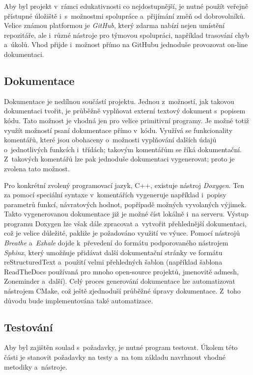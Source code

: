 Aby byl projekt v~rámci edukativnosti co nejdostupnější, je nutné použít veřejně přístupné úložiště i~s~možnostmi spolupráce a~přijímání změň od dobrovolníků. Velice známou platformou je \emph{GitHub}, který zdarma nabízí nejen umístění repozitáře, ale i~různé nástroje pro týmovou spolupráci, například trasování chyb a~úkolů. Vhod přijde i~možnost přímo na GitHubu jednoduše provozovat on-line dokumentaci.

\subsection{Dokumentace}
Dokumentace je nedílnou součástí projektu. Jednou z~možností, jak takovou dokumentaci tvořit, je průběžně vyplňovat externí textový dokument s~popisem kódu. Tato možnost je vhodná jen pro velice primitivní programy. Je možné totiž využít možností psaní dokumentace přímo v~kódu. Využívá se funkcionality komentářů, které jsou obohaceny o~možnosti vyplňování dalších údajů o~jednotlivých funkcích i~třídách; takovým komentářům se říká dokumentační. Z~takových komentářů lze pak jednoduše dokumentaci vygenerovat; proto je zvolena tato možnost.

Pro konkrétní zvolený programovací jazyk, C++, existuje nástroj \emph{Doxygen}. Ten za pomocí speciální syntaxe v~komentářích vygeneruje například i~popisy parametrů funkcí, návratových hodnot, popřípadě možných vyvolaných výjimek. Takto vygenerovanou dokumentace již je možné číst lokálně i~na serveru. Výstup programu Doxygen lze však dále zpracovat a~vytvořit přehlednější dokumentaci, což je velice důležité, pakliže je požadováno využití ve výuce. Pomocí nástrojů \emph{Breathe} a~\emph{Exhale} dojde k~převedení do formátu podporovaného nástrojem \emph{Sphinx}, který umožňuje přidávat další dokumentační stránky ve formátu reStructuredText a~použití velmi přehledných šablon (například šablona ReadTheDocs používaná pro mnoho open-source projektů, jmenovitě admesh, Zoneminder a~další). Celý proces generování dokumentace lze automatizovat nástrojem CMake, což ještě zjednoduší průběžné úpravy dokumentace. Z~toho důvodu bude implementována také automatizace.

\subsection{Testování}
Aby byl zajištěn soulad s~požadavky, je nutné program testovat. Úkolem této části je stanovit požadavky na testy a~na tom základu navrhnout vhodné metodiky a~nástroje.

